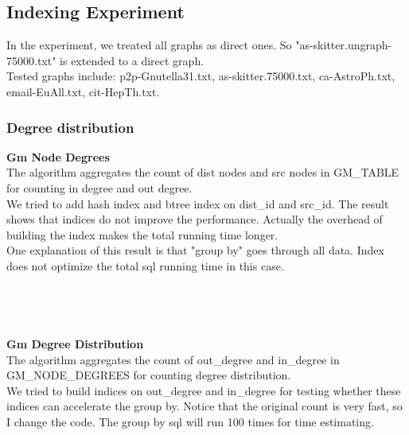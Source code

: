 \subsection{Indexing Experiment}

In the experiment, we treated all graphs as direct ones. So "as-skitter.ungraph-75000.txt" is extended to a direct graph. \\
Tested graphs include: p2p-Gnutella31.txt, as-skitter.75000.txt, ca-AstroPh.txt, email-EuAll.txt, cit-HepTh.txt.\\


\subsubsection{Degree distribution}

\textbf{Gm Node Degrees}
\\
The algorithm aggregates the count of dist nodes and src nodes in GM\_TABLE for counting in degree and out degree. \\
We tried to add hash index and btree index on dist\_id and src\_id. The result shows that indices do not improve the performance. Actually the overhead of building the index makes the total running time longer.\\
One explanation of this result is that "group by" goes through all data. Index does not optimize the total sql running time in this case.\\
\\
\\
\\
\\
\textbf{Gm Degree Distribution}
\\
The algorithm aggregates the count of out\_degree and in\_degree in GM\_NODE\_DEGREES for counting degree distribution. \\
We tried to build indices on out\_degree and in\_degree for testing whether these indices can accelerate the group by. Notice that the original count is very fast, so I change the code. The group by sql will run 100 times for time estimating.\\
